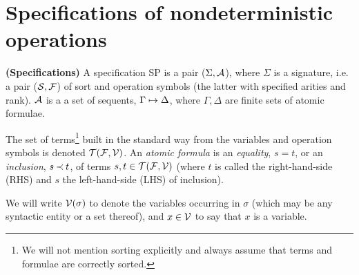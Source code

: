 \section{Specifications of nondeterministic operations}\label{se:specs}

\begin{DEFINITION} {\bf (Specifications)} \label{de:terms-vars-forms}
A specification SP is a pair ($\Sigma,{\cal {A}}$), where $\Sigma$ is a signature, i.e.
a pair (${\cal S},{\cal F}$) of sort and operation symbols (the latter with specified
arities and rank). ${\cal {A}}$ is a a set of sequents, $\Gamma\mathrel{\mapsto}\Delta$, 
where $\Gamma, \Delta$ are finite sets of atomic formulae.

The set of terms\footnote{We will not mention sorting explicitly
and always assume that terms and formulae are correctly sorted.}
 built in the standard way from the variables and
operation symbols is denoted ${\cal T}({\cal F},\mbox{$\cal V$})$. An {\em atomic formula} 
is an {\em equality}, $s=t$, or an {\em inclusion}, $s\mathbin{\prec} t$, of terms
$s,t\in{\cal T}({\cal F},{\cal V})$ (where $t$ is called the 
right-hand-side (RHS) and $s$ the left-hand-side (LHS) of inclusion).
\end{DEFINITION}
\noindent
We will write $\mbox{$\cal V$}(\sigma)$ to denote the variables occurring in $\sigma$ 
(which may be any syntactic entity or a set thereof), and $x\in{\cal V}$ to say that
$x$ is a variable.

